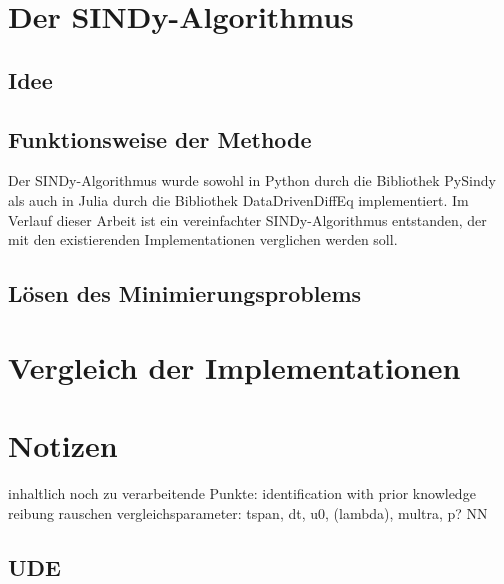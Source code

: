 \documentclass[arbeit=studie,oneside,BCOR=12mm]{ArbeitRST}
\begin{document}
%



\chapter{Der SINDy-Algorithmus}

\section{Idee}

\section{Funktionsweise der Methode}

Der SINDy-Algorithmus wurde sowohl in Python durch die Bibliothek PySindy \cite{Silva2020} als auch in Julia durch die Bibliothek DataDrivenDiffEq implementiert. Im Verlauf dieser Arbeit ist ein vereinfachter SINDy-Algorithmus entstanden, der mit den existierenden Implementationen verglichen werden soll.
\section{Lösen des Minimierungsproblems}


\chapter{Vergleich der Implementationen}












\chapter{Notizen}
inhaltlich noch zu verarbeitende Punkte:
identification with prior knowledge
reibung
rauschen
vergleichsparameter: tspan, dt, u0, (lambda), multra, p?
NN



\section{UDE}
\end{document}
